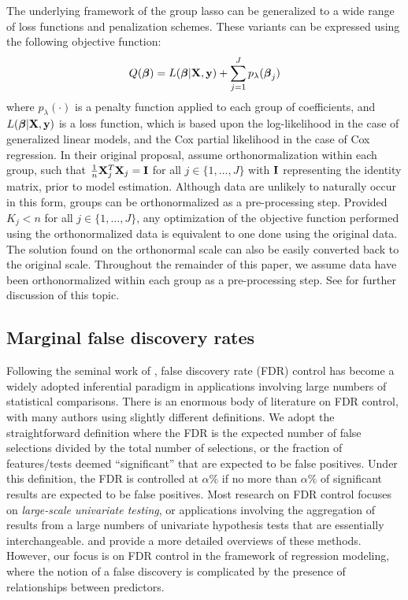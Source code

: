 The underlying framework of the group lasso can be generalized to a wide range of loss functions and penalization schemes. These variants can be expressed using the following objective function:
\begin{equation}
Q(\boldsymbol{\beta}) = L(\boldsymbol{\beta}|\mathbf{X},\mathbf{y}) + \sum_{j = 1}^{J} p_{\lambda}(\boldsymbol{\beta}_j)
\end{equation}
where $p_{\lambda}(\cdot)$ is a penalty function applied to each group of coefficients, and $L(\boldsymbol{\beta}|\mathbf{X},\mathbf{y})$ is a loss function, which is based upon the log-likelihood in the case of generalized linear models, and the Cox partial likelihood in the case of Cox regression.
In their original proposal, \citet{Yuan2006} assume orthonormalization within each group, such that $\tfrac{1}{n}\mathbf{X}_j^T\mathbf{X}_j = \mathbf{I}$ for all $j \in \{1, \ldots, J\}$ with $\mathbf{I}$ representing the identity matrix, prior to model estimation. Although data are unlikely to naturally occur in this form, groups can be orthonormalized as a pre-processing step. Provided $K_j < n$ for all $j \in \{1, \ldots, J\}$, any optimization of the objective function performed using the orthonormalized data is equivalent to one done using the original data. The solution found on the orthonormal scale can also be easily converted back to the original scale. Throughout the remainder of this paper, we assume data have been orthonormalized within each group as a pre-processing step. See \citet{Simon2012} for further discussion of this topic.


\subsection{Marginal false discovery rates}

Following the seminal work of \citet{BH_1995}, false discovery rate (FDR) control has become a widely adopted inferential paradigm in applications involving large numbers of statistical comparisons. There is an enormous body of literature on FDR control, with many authors using slightly different definitions. We adopt the straightforward definition where the FDR is the expected number of false selections divided by the total number of selections, or the fraction of features/tests deemed ``significant” that are expected to be false positives. Under this definition, the FDR is controlled at $\alpha \%$ if no more than $\alpha \%$ of significant results are expected to be false positives.
Most research on FDR control focuses on \textit{large-scale univariate testing}, or applications involving the aggregation of results from a large numbers of univariate hypothesis tests that are essentially interchangeable. \citet{Farcomeni2008} and \citet{Strimmer2008} provide a more detailed overviews of these methods. However, our focus is on FDR control in the framework of regression modeling, where the notion of a false discovery is complicated by the presence of relationships between predictors. 


